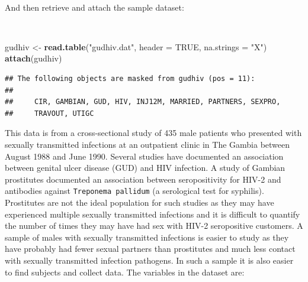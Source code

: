 \documentclass[12pt,a4paper]{book}
\newenvironment{Shaded}{\begin{snugshade}}{\end{snugshade}}
\newcommand{\KeywordTok}[1]{\textcolor[rgb]{0.13,0.29,0.53}{\textbf{#1}}}
\newcommand{\DataTypeTok}[1]{\textcolor[rgb]{0.13,0.29,0.53}{#1}}
\newcommand{\StringTok}[1]{\textcolor[rgb]{0.31,0.60,0.02}{#1}}
\newcommand{\OtherTok}[1]{\textcolor[rgb]{0.56,0.35,0.01}{#1}}
\newcommand{\NormalTok}[1]{#1}
\theoremstyle{definition}
\theoremstyle{definition}
\theoremstyle{definition}
\theoremstyle{remark}
\begin{document}
~

And then retrieve and attach the sample dataset:

~

\begin{Shaded}
\begin{Highlighting}[]
\NormalTok{gudhiv <-}\StringTok{ }\KeywordTok{read.table}\NormalTok{(}\StringTok{"gudhiv.dat"}\NormalTok{, }\DataTypeTok{header =} \OtherTok{TRUE}\NormalTok{, }\DataTypeTok{na.strings =} \StringTok{"X"}\NormalTok{)}
\KeywordTok{attach}\NormalTok{(gudhiv)}
\end{Highlighting}
\end{Shaded}

\begin{verbatim}
## The following objects are masked from gudhiv (pos = 11):
## 
##     CIR, GAMBIAN, GUD, HIV, INJ12M, MARRIED, PARTNERS, SEXPRO,
##     TRAVOUT, UTIGC
\end{verbatim}

\newpage

This data is from a cross-sectional study of 435 male patients who
presented with sexually transmitted infections at an outpatient clinic
in The Gambia between August 1988 and June 1990. Several studies have
documented an association between genital ulcer disease (GUD) and HIV
infection. A study of Gambian prostitutes documented an association
between seropositivity for HIV-2 and antibodies against
\texttt{Treponema\ pallidum} (a serological test for syphilis).
Prostitutes are not the ideal population for such studies as they may
have experienced multiple sexually transmitted infections and it is
difficult to quantify the number of times they may have had sex with
HIV-2 seropositive customers. A sample of males with sexually
transmitted infections is easier to study as they have probably had
fewer sexual partners than prostitutes and much less contact with
sexually transmitted infection pathogens. In such a sample it is also
easier to find subjects and collect data. The variables in the dataset
are:

~
\end{document}
